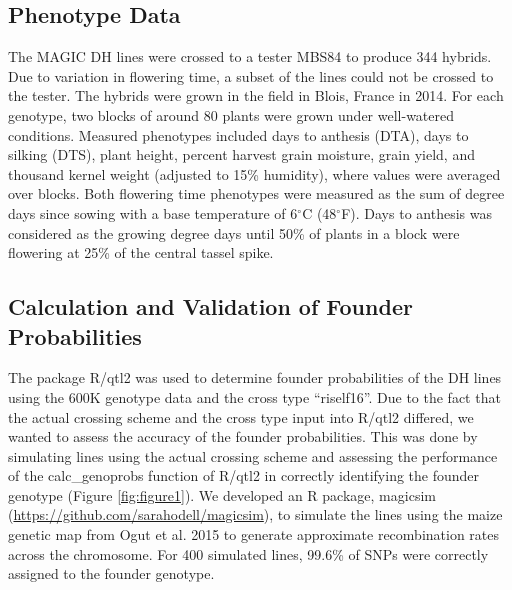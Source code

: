 \documentclass[article,9pt,twocolumn,twoside]{rilabRxiv}
\begin{document}
\subsection{Phenotype Data}
The MAGIC DH lines were crossed to a tester MBS84 to produce 344 hybrids.
 Due to variation in flowering time, a subset of the lines could not be crossed
  to the tester. The hybrids were grown in the field in Blois, France in 2014.
   For each genotype, two blocks of around 80 plants were grown under
   well-watered conditions. Measured phenotypes included days to anthesis (DTA),
    days to silking (DTS), plant height, percent harvest grain moisture, grain
     yield, and thousand kernel weight (adjusted to 15\% humidity), where values
      were averaged over blocks. Both flowering time phenotypes were measured as
       the sum of degree days since sowing with a base temperature of
        6$^{\circ}$C (48$^{\circ}$F). Days to anthesis was considered as the
         growing degree days until 50\% of plants in a block were flowering at
          25\% of the central tassel spike.

\subsection{Calculation and Validation of Founder Probabilities}
The package R/qtl2 \citep{RN39} was used to determine founder probabilities of the DH
 lines using the 600K genotype data and the cross type ``riself16''. Due to the
  fact that the actual crossing scheme and the cross type input into R/qtl2
   differed, we wanted to assess the accuracy of the founder probabilities.
    This was done by simulating lines using the actual crossing scheme and
     assessing the performance of the calc\_genoprobs function of R/qtl2 in
      correctly identifying the founder genotype (Figure \ref{fig:figure1}). We developed an R package,
       magicsim (\url{https://github.com/sarahodell/magicsim}), to simulate the lines using the maize genetic map
        from Ogut et al. 2015 to generate approximate recombination rates across
         the chromosome. For 400 simulated lines, 99.6\% of SNPs were correctly
          assigned to the founder genotype.
\end{document}
